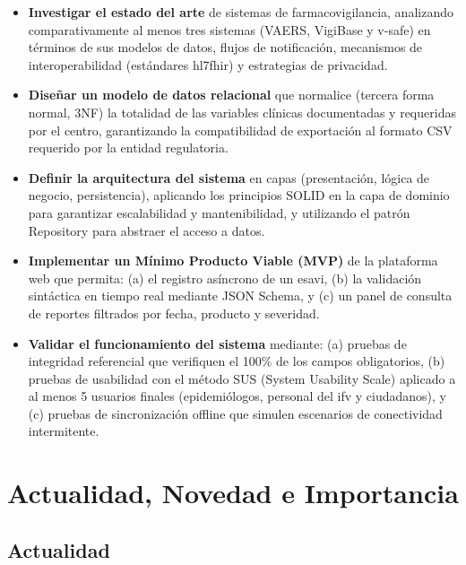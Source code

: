 \begin{itemize}
    \item \textbf{Investigar el estado del arte} de sistemas de farmacovigilancia, analizando comparativamente al menos tres sistemas (VAERS, VigiBase y v-safe) en términos de sus modelos de datos, flujos de notificación, mecanismos de interoperabilidad (estándares \gls{hl7fhir}) y estrategias de privacidad.
    
    \item \textbf{Diseñar un modelo de datos relacional} que normalice (tercera forma normal, 3NF) la totalidad de las variables clínicas documentadas y requeridas por el centro, garantizando la compatibilidad de exportación al formato CSV requerido por la entidad regulatoria.
    
    \item \textbf{Definir la arquitectura del sistema} en capas (presentación, lógica de negocio, persistencia), aplicando los principios \gls{SOLID} en la capa de dominio para garantizar escalabilidad y mantenibilidad, y utilizando el patrón \gls{Repository} para abstraer el acceso a datos.
    
    \item \textbf{Implementar un Mínimo Producto Viable (MVP)} de la plataforma web que permita: (a) el registro asíncrono de un \gls{esavi}, (b) la validación sintáctica en tiempo real mediante \gls{JSON Schema}, y (c) un panel de consulta de reportes filtrados por fecha, producto y severidad.
   
    \item \textbf{Validar el funcionamiento del sistema} mediante: (a) pruebas de integridad referencial que verifiquen el 100\% de los campos obligatorios, (b) pruebas de usabilidad con el método \gls{SUS} (System Usability Scale) aplicado a al menos 5 usuarios finales (epidemiólogos, personal del \gls{ifv} y ciudadanos), y (c) pruebas de sincronización offline que simulen escenarios de conectividad intermitente.
\end{itemize}




\section{Actualidad, Novedad e Importancia}\label{section:actualidadNovedadImportancia}


\subsection{Actualidad}



